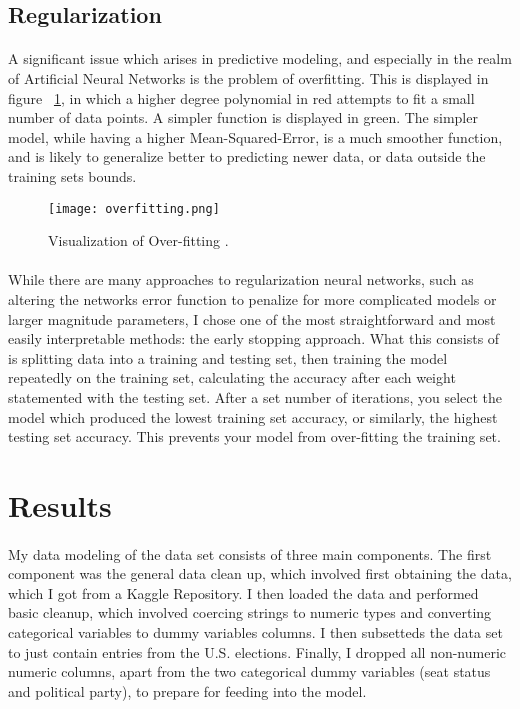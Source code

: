 \documentclass[11pt]{scrartcl} %
\begin{document}
\subsection{Regularization}
\paragraph{}
A significant issue which arises in predictive modeling, and especially in the realm of Artificial Neural Networks is the problem of overfitting. This is displayed in figure ~\ref{overfittingpic}, in which a higher degree polynomial in red attempts to fit a small number of data points. A simpler function is displayed in green. The simpler model, while having a higher Mean-Squared-Error, is a much smoother function, and is likely to generalize better to predicting newer data, or data outside the training sets bounds.

\begin{figure}[h] %
	\centering
	\texttt{[image: overfitting.png]}
	\caption{Visualization of Over-fitting \cite{bishoptextbook}.}
	\label{overfittingpic}
\end{figure}

\paragraph{}
While there are many approaches to regularization neural networks, such as altering the networks error function to penalize for more complicated models or larger magnitude parameters, I chose one of the most straightforward and most easily interpretable methods: the early stopping approach. What this consists of is splitting data into a training and testing set, then training the model repeatedly on the training set, calculating the accuracy after each weight statemented with the testing set. After a set number of iterations, you select the model which produced the lowest training set accuracy, or similarly, the highest testing set accuracy. This prevents your model from over-fitting the training set.


\section{Results}
\paragraph{}
My data modeling of the data set consists of three main components. The first component was the general data clean up, which involved first obtaining the data, which I got from a Kaggle Repository. I then loaded the data and performed basic cleanup, which involved coercing strings to numeric types and converting categorical variables to dummy variables columns. I then subsetteds the data set to just contain entries from the U.S. elections. Finally, I dropped all non-numeric numeric columns, apart from the two categorical dummy variables (seat status and political party), to prepare for feeding into the model.
\end{document}
